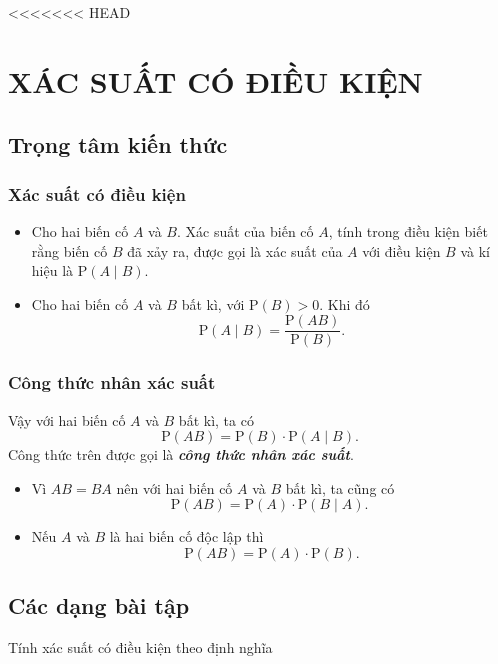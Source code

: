 <<<<<<< HEAD
\setcounter{section}{0}
\section{XÁC SUẤT CÓ ĐIỀU KIỆN}
\subsection{Trọng tâm kiến thức}
\begin{tomtat}
	\subsubsection{Xác suất có điều kiện}
	\begin{boxdn}
	\begin{itemize}
	\item
	Cho hai biến cố $A$ và $B$. Xác suất của biến cố $A$, tính trong điều kiện biết rằng biến cố $B$ đã xảy ra, được gọi là xác suất của $A$ với điều kiện $B$ và kí hiệu là $\mathrm{P}(A\mid B)$.
	\item
	Cho hai biến cố $A$ và $B$ bất kì, với $\mathrm{P}(B)>0$. Khi đó
	$$\mathrm{P}(A \mid B)=\dfrac{\mathrm{P}(A B)}{\mathrm{P}(B)}.$$
	\end{itemize}
	\end{boxdn}
	\subsubsection{Công thức nhân xác suất}
	\begin{boxdn}
	Vậy với hai biến cố $A$ và $B$ bất kì, ta có
	$$\mathrm{P}(A B)=\mathrm{P}(B) \cdot \mathrm{P}(A \mid B).$$
	Công thức trên được gọi là \textbf{\textit{công thức nhân xác suất}}.
	\end{boxdn}
	\begin{note}
	\begin{itemize}
	\item Vì $AB=BA$ nên với hai biến cố $A$ và $B$ bất kì, ta cũng có
	$$\mathrm{P}(A B)=\mathrm{P}(A) \cdot \mathrm{P}(B \mid A) \text{. }$$
	\item Nếu $A$ và $B$ là hai biến cố độc lập thì
	$$\mathrm{P}(A B)=\mathrm{P}(A) \cdot \mathrm{P}(B).$$
	\end{itemize}
	\end{note}
\end{tomtat}
\subsection{Các dạng bài tập}
\begin{dang}{Tính xác suất có điều kiện theo định nghĩa}
\end{dang}
